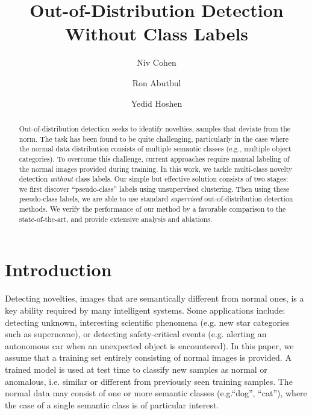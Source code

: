 \documentclass[runningheads]{llncs}
\begin{document}
\pagestyle{headings}
\mainmatter
\def\ECCVSubNumber{100}  

\title{Out-of-Distribution Detection \\ Without Class Labels} 



\author{Niv Cohen
\and
Ron Abutbul
\and
Yedid Hoshen
}
\maketitle

\begin{abstract}

Out-of-distribution detection seeks to identify novelties, samples that deviate from the norm. The task has been found to be quite challenging, particularly in the case where the normal  data distribution consists of multiple semantic classes (e.g., multiple object categories). To overcome this challenge, current approaches require manual labeling of the normal images provided during training. In this work, we tackle multi-class novelty detection \textit{without} class labels. Our simple but effective solution consists of two stages: we first discover ``pseudo-class'' labels using unsupervised clustering. Then using these pseudo-class labels, we are able to use standard \textit{supervised} out-of-distribution detection methods. We verify the performance of our method by a favorable comparison to the state-of-the-art, and provide extensive analysis and ablations.


\end{abstract}

\section{Introduction}

Detecting novelties, images that are semantically different from normal ones, is a key ability required by many intelligent systems. Some applications include: detecting unknown, interesting scientific phenomena (e.g. new star categories such as supernovae), or detecting safety-critical events (e.g. alerting an autonomous car when an unexpected object is encountered). In this paper, we assume that a training set entirely consisting of normal images is provided. A trained model is used at test time to classify new samples as normal or anomalous, i.e. similar or different from previously seen training samples. The normal data may consist of one or more semantic classes (e.g.``dog'', ``cat''), where the case of a single semantic class is of particular interest.
\end{document}
